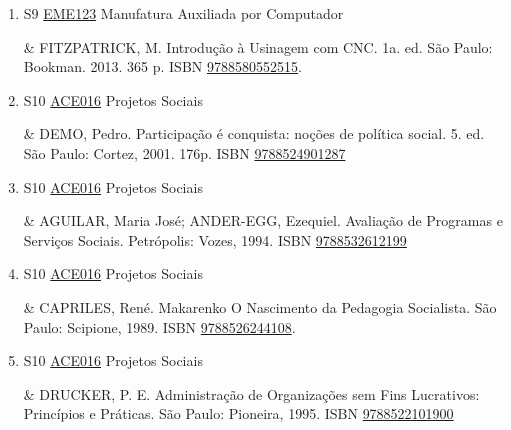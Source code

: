 \documentclass[12pt,a4paper]{book}
\begin{document}
\begin{enumerate}
&  GROOVER, Mikell P.  Automação Industrial e Sistemas de Manufatura.  3ed.  São Paulo: Pearson, 2011.  581 p.  ISBN \href{http://www.bn.br/site/pages/servicosProfissionais/agenciaISBN/isbnBusca/FbnBuscaISBNCatalogo.asp?pField=ISBN&pIntPagina=1&pISBN=76058717&nidbISBN=true&hidbISBN=true}{9788576058717}

 

 \item S9 \hyperref[PUD:EME123]{EME123} Manufatura Auxiliada por Computador

&  FITZPATRICK, M.  Introdução à Usinagem com CNC.  1a.  ed.  São Paulo: Bookman.  2013.  365 p.  ISBN \href{http://www.bn.br/site/pages/servicosProfissionais/agenciaISBN/isbnBusca/FbnBuscaISBNCatalogo.asp?pField=ISBN&pIntPagina=1&pISBN=80552515&nidbISBN=true&hidbISBN=true}{9788580552515}.
 \item S10 \hyperref[PUD:ACE016]{ACE016} Projetos Sociais

&   DEMO, Pedro.  Participação é conquista: noções de política social.  5. ed.  São Paulo: Cortez, 2001.  176p.  ISBN \href{http://www.bn.br/site/pages/servicosProfissionais/agenciaISBN/isbnBusca/FbnBuscaISBNCatalogo.asp?pField=ISBN&pIntPagina=1&pISBN=24901287&nidbISBN=true&hidbISBN=true}{9788524901287}
 

 \item S10 \hyperref[PUD:ACE016]{ACE016} Projetos Sociais

&   AGUILAR, Maria José;  ANDER-EGG, Ezequiel.  Avaliação de Programas e Serviços Sociais.  Petrópolis: Vozes, 1994.  ISBN \href{http://www.bn.br/site/pages/servicosProfissionais/agenciaISBN/isbnBusca/FbnBuscaISBNCatalogo.asp?pField=ISBN&pIntPagina=1&pISBN=32612199&nidbISBN=true&hidbISBN=true}{9788532612199}
 

 \item S10 \hyperref[PUD:ACE016]{ACE016} Projetos Sociais

&   CAPRILES, René.  Makarenko O Nascimento da Pedagogia Socialista.  São Paulo: Scipione, 1989.  ISBN \href{http://www.bn.br/site/pages/servicosProfissionais/agenciaISBN/isbnBusca/FbnBuscaISBNCatalogo.asp?pField=ISBN&pIntPagina=1&pISBN=26244108&nidbISBN=true&hidbISBN=true}{9788526244108}.
 \item S10 \hyperref[PUD:ACE016]{ACE016} Projetos Sociais

&   DRUCKER, P.  E.  Administração de Organizações sem Fins Lucrativos: Princípios e Práticas.  São Paulo: Pioneira, 1995.  ISBN \href{http://www.bn.br/site/pages/servicosProfissionais/agenciaISBN/isbnBusca/FbnBuscaISBNCatalogo.asp?pField=ISBN&pIntPagina=1&pISBN=22101900&nidbISBN=true&hidbISBN=true}{9788522101900}
 


\end{enumerate}
\end{document}
